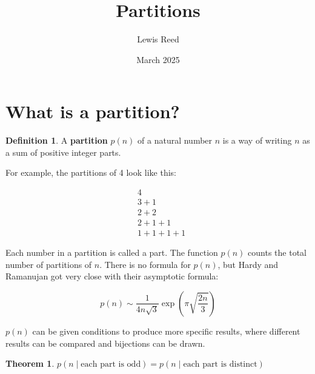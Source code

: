 \documentclass{article}
\title{Partitions}
\author{Lewis Reed}
\date{March 2025}
\theoremstyle{definition}
\newtheorem{definition}{Definition}
\newtheorem{theorem}{Theorem}
\begin{document}
\maketitle

\section{What is a partition?}

\begin{definition}
    A \textbf{partition} $p(n)$ of a natural number $n$ is a way of writing $n$ as a sum of positive integer parts.
\end{definition}

\noindent
For example, the partitions of 4 look like this:

\[
\begin{aligned}
&4 \\
&3 + 1 \\
&2 + 2 \\
&2 + 1 + 1 \\
&1 + 1 + 1 + 1
\end{aligned}
\]

\noindent
Each number in a partition is called a part. The function $p(n)$ counts the total number of partitions of $n$.
There is no formula for $p(n)$, but Hardy and Ramanujan got very close with their asymptotic formula:

\[
p(n) \sim \frac{1}{4n\sqrt{3}}\exp\left(\pi\sqrt{\frac{2n}{3}}\right)
\]

\noindent
$p(n)$ can be given conditions to produce more specific results, where different results can be compared
and bijections can be drawn.

\begin{theorem}
    $p(n \mid \text{each part is odd}) = p(n \mid \text{each part is distinct})$
\end{theorem}
    
\end{document}
